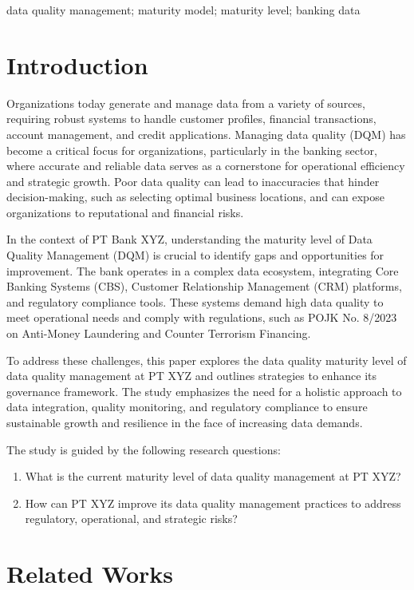 \documentclass[conference]{IEEEtran}
\begin{document}
\begin{IEEEkeywords}
data quality management; maturity model; maturity level; banking data
\end{IEEEkeywords}

\section{Introduction}
Organizations today generate and manage data from a variety of sources, requiring robust systems to handle customer profiles, financial transactions, account management, and credit applications. Managing data quality (DQM) has become a critical focus for organizations, particularly in the banking sector, where accurate and reliable data serves as a cornerstone for operational efficiency and strategic growth. Poor data quality can lead to inaccuracies that hinder decision-making, such as selecting optimal business locations, and can expose organizations to reputational and financial risks.

In the context of PT Bank XYZ, understanding the maturity level of Data Quality Management (DQM) is crucial to identify gaps and opportunities for improvement. The bank operates in a complex data ecosystem, integrating Core Banking Systems (CBS), Customer Relationship Management (CRM) platforms, and regulatory compliance tools. These systems demand high data quality to meet operational needs and comply with regulations, such as POJK No. 8/2023 on Anti-Money Laundering and Counter Terrorism Financing.

To address these challenges, this paper explores the data quality maturity level of data quality management at PT XYZ and outlines strategies to enhance its governance framework. The study emphasizes the need for a holistic approach to data integration, quality monitoring, and regulatory compliance to ensure sustainable growth and resilience in the face of increasing data demands.

The study is guided by the following research questions:
\begin{enumerate}
    \item What is the current maturity level of data quality management at PT XYZ?
    \item How can PT XYZ improve its data quality management practices to address regulatory, operational, and strategic risks?
\end{enumerate}


\section{Related Works}
\end{document}
